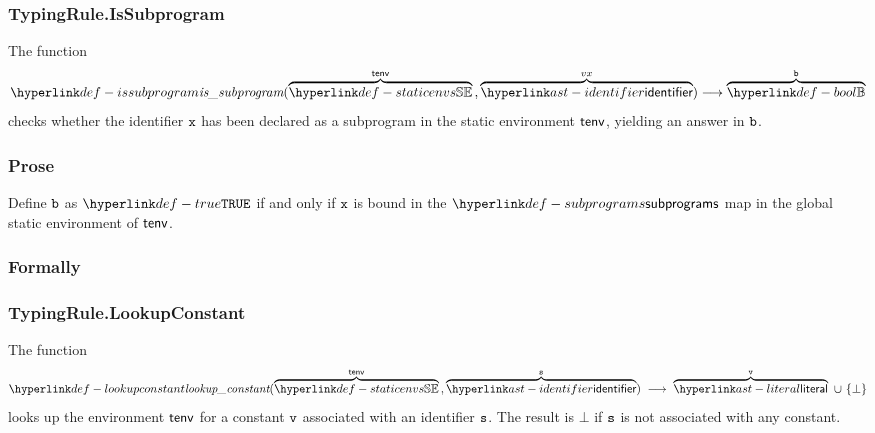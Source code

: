 \subsubsection{TypingRule.IsSubprogram\label{sec:TypingRule.IsSubprogram}}
\hypertarget{def-issubprogram}{}
The function
\[
\issubprogram(\overname{\staticenvs}{\tenv} \aslsep \overname{\identifier}{vx}) \aslto \overname{\Bool}{\vb}
\]
checks whether the identifier $\vx$ has been declared as a subprogram in the static environment $\tenv$,
yielding an answer in $\vb$.

\subsubsection{Prose}
Define $\vb$ as $\True$ if and only if $\vx$ is bound in the $\subprograms$ map in the global static
environment of $\tenv$.

\subsubsection{Formally}
\begin{mathpar}
\end{mathpar}

\subsubsection{TypingRule.LookupConstant}
\hypertarget{def-lookupconstant}{}
The function
\[
  \lookupconstant(\overname{\staticenvs}{\tenv} \aslsep \overname{\identifier}{\vs})
  \;\aslto\; \overname{\literal}{\vv}\ \cup\ \{\bot\}
\]
looks up the environment $\tenv$ for a constant $\vv$ associated with an identifier
$\vs$. The result is $\bot$ if $\vs$ is not associated with any constant.

